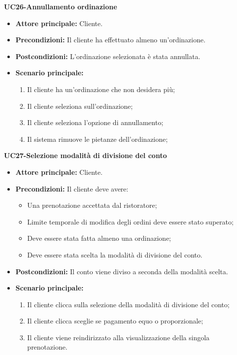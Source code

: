 
\textbf{UC26-Annullamento ordinazione}
\begin{itemize}
\item \textbf{Attore principale:} Cliente.
\item \textbf{Precondizioni:} Il cliente ha effettuato almeno un'ordinazione.
\item \textbf{Postcondizioni:} L'ordinazione selezionata è stata annullata.
\item \textbf{Scenario principale:}
\begin{enumerate}
    \item Il cliente ha un'ordinazione che non desidera più;
    \item Il cliente seleziona sull'ordinazione;
    \item Il cliente seleziona l'opzione di annullamento;
    \item Il sistema rimuove le pietanze dell'ordinazione;
\end{enumerate}
\end{itemize}

\textbf{UC27-Selezione modalità di divisione del conto}
\begin{itemize}
\item \textbf{Attore principale:} Cliente.
\item \textbf{Precondizioni:} Il cliente deve avere:
  \begin{itemize}
    \item Una prenotazione accettata dal ristoratore;
    \item Limite temporale di modifica degli ordini deve essere stato superato;
    \item Deve essere stata fatta almeno una ordinazione;
    \item Deve essere stata scelta la modalità di divisione del conto.
  \end{itemize}
\item \textbf{Postcondizioni:} Il conto viene diviso a seconda della modalità scelta.
\item \textbf{Scenario principale:}
\begin{enumerate}
    \item Il cliente clicca sulla selezione della modalità di divisione del conto;
    \item Il cliente clicca sceglie se pagamento equo o proporzionale;
    \item Il cliente viene reindirizzato alla visualizzazione della singola prenotazione.
\end{enumerate}
\end{itemize}


